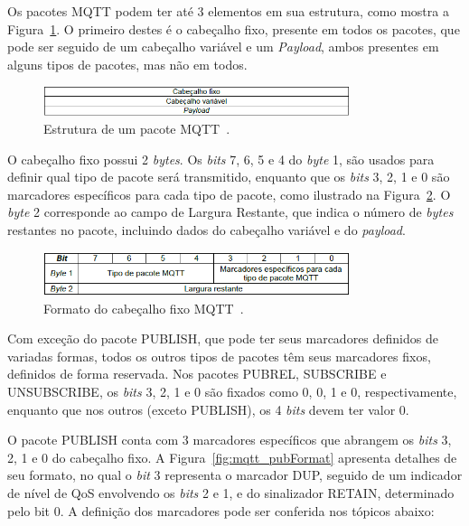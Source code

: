 Os pacotes MQTT podem ter até 3 elementos em sua estrutura, como mostra a Figura~\ref{fig:mqtt_format}. O primeiro destes é o cabeçalho fixo, presente em todos os pacotes, que pode ser seguido de um cabeçalho variável e um \textit{Payload}, ambos presentes em alguns tipos de pacotes, mas não em todos.

\begin{figure}[ht]
	\centering
	\includegraphics[width=0.8\textwidth]{imagens/mqtt_format.png}
	\caption{Estrutura de um pacote MQTT~\cite{mqttv3.1.1}.
		\label{fig:mqtt_format}}
\end{figure}
\FloatBarrier

O cabeçalho fixo possui 2 \textit{bytes}. Os \textit{bits} 7, 6, 5 e 4 do \textit{byte} 1, são usados para definir qual tipo de pacote será transmitido, enquanto que os \textit{bits} 3, 2, 1 e 0 são marcadores específicos para cada tipo de pacote, como ilustrado na Figura~\ref{fig:mqtt_pacFormat}. O \textit{byte} 2 corresponde ao campo de Largura Restante, que indica o número de \textit{bytes} restantes no pacote, incluindo dados do cabeçalho variável e do \textit{payload}.

\begin{figure}[ht]
	\centering
	\includegraphics[width=0.8\textwidth]{imagens/mqtt_pacFormat.png}
	\caption{Formato do cabeçalho fixo MQTT~\cite{mqttv3.1.1}.
		\label{fig:mqtt_pacFormat}}
\end{figure}
\FloatBarrier

Com exceção do pacote PUBLISH, que pode ter seus marcadores definidos de variadas formas, todos os outros tipos de pacotes têm seus marcadores fixos, definidos de forma reservada. Nos pacotes PUBREL, SUBSCRIBE e UNSUBSCRIBE, os \textit{bits} 3, 2, 1 e 0 são fixados como 0, 0, 1 e 0, respectivamente, enquanto que nos outros (exceto PUBLISH), os 4 \textit{bits} devem ter valor 0.

O pacote PUBLISH conta com 3 marcadores específicos que abrangem os \textit{bits} 3, 2, 1 e 0 do cabeçalho fixo. A Figura~\ref{fig:mqtt_pubFormat} apresenta detalhes de seu formato, no qual o \textit{bit} 3 representa o marcador DUP, seguido de um indicador de nível de QoS envolvendo os \textit{bits} 2 e 1, e do sinalizador RETAIN, determinado pelo bit 0. A definição dos marcadores pode ser conferida nos tópicos abaixo:

